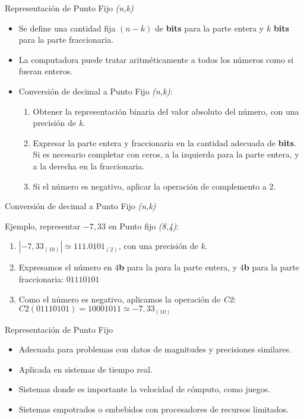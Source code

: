\documentclass[11pt,a4paper,spanish]{beamer}
\newcommand{\bit}{\textbf{b}}
\begin{document}
\begin{frame}{Representación de Punto Fijo \emph{(n,k)}}
\begin{itemize}
    \item Se define una cantidad fija $(n-k)$ de \textbf{bits} para la parte
        entera y $k$ \textbf{bits} para la parte fraccionaria.
    \item La computadora puede tratar aritméticamente a todos los números como
        si fueran enteros.
    \item Conversión de decimal a Punto Fijo \emph{(n,k)}:
    \begin{enumerate}
        \item Obtener la representación binaria del valor absoluto del número,
            con una precisión de \emph{k}.
        \item Expresar la parte entera y fraccionaria en la cantidad adecuada de
            \textbf{bits}. Si es necesario completar con ceros, a la izquierda
            para la parte entera, y a la derecha en la fraccionaria.
        \item Si el número es negativo, aplicar la operación de complemento a
            2.
    \end{enumerate}
\end{itemize}
\end{frame}

\begin{frame}{Conversión de decimal a Punto Fijo \emph{(n,k)}}

    Ejemplo, representar $-7,33$ en Punto fijo \emph{(8,4)}:\pause

    \begin{enumerate}
        \item $|-7,33_{(10)}| \simeq 111.0101_{(2)}$, con una precisión de
            \emph{k}.
            \pause
        \item Expresamos el número en 4\bit{} para la para la parte entera, y
            4\bit{} para la parte fraccionaria: $01110101$
            \pause
        \item Como el número es negativo, aplicamos la operación de \emph{C2}:
            $C2(01110101) = 10001011 \simeq -7,33_{(10)}$
    \end{enumerate}
\end{frame}

\begin{frame}{Representación de Punto Fijo}
\begin{itemize}
    \item Adecuada para problemas con datos de magnitudes y precisiones
        similares.
    \item Aplicada en sistemas de tiempo real.
    \item Sistemas donde es importante la velocidad de cómputo, como juegos.
    \item Sistemas empotrados o embebidos con procesadores de recursos
        limitados.
\end{itemize}
\end{frame}
\end{document}
